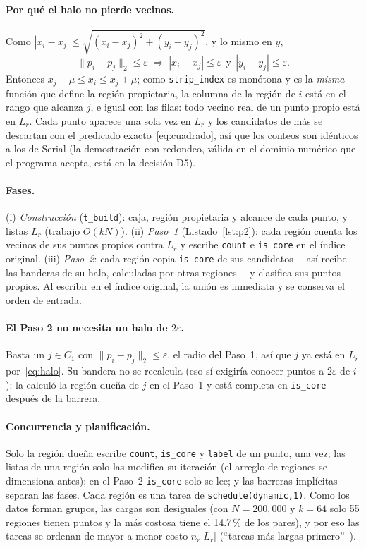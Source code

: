 \documentclass[11pt,letterpaper]{article}
\newcommand{\code}[1]{\texttt{#1}}
\begin{document}
\paragraph{Por qué el halo no pierde vecinos.} Como $|x_i-x_j|\le\sqrt{(x_i-x_j)^2+(y_i-y_j)^2}$, y lo mismo en $y$,
\begin{equation}\label{eq:halo}
  \lVert p_i-p_j\rVert_2\le\varepsilon \;\Longrightarrow\; |x_i-x_j|\le\varepsilon\ \ \text{y}\ \
  |y_i-y_j|\le\varepsilon .
\end{equation}
Entonces $x_j-\mu\le x_i\le x_j+\mu$; como \code{strip\_index} es monótona y es la \emph{misma} función que define
la región propietaria, la columna de la región de $i$ está en el rango que alcanza $j$, e igual con las filas: todo
vecino real de un punto propio está en $L_r$. Cada punto aparece una sola vez en $L_r$ y los candidatos de más se
descartan con el predicado exacto~\eqref{eq:cuadrado}, así que los conteos son idénticos a los de Serial (la
demostración con redondeo, válida en el dominio numérico que el programa acepta, está en la decisión D5).

\paragraph{Fases.} (i) \emph{Construcción} (\code{t\_build}): caja, región propietaria y alcance de cada punto, y
listas $L_r$ (trabajo $O(kN)$). (ii) \emph{Paso~1} (Listado~\ref{lst:p2}): cada región cuenta los vecinos de sus
puntos propios contra $L_r$ y escribe \code{count} e \code{is\_core} en el índice original. (iii) \emph{Paso~2}: cada
región copia \code{is\_core} de sus candidatos ---así recibe las banderas de su halo, calculadas por otras
regiones--- y clasifica sus puntos propios. Al escribir en el índice original, la unión es inmediata y se conserva el
orden de entrada.

\paragraph{El Paso 2 no necesita un halo de $2\varepsilon$.} Basta un $j\in C_1$ con
$\lVert p_i-p_j\rVert_2\le\varepsilon$, el radio del Paso~1, así que $j$ ya está en $L_r$ por~\eqref{eq:halo}. Su
bandera no se recalcula (eso sí exigiría conocer puntos a $2\varepsilon$ de $i$): la calculó la región dueña de $j$
en el Paso~1 y está completa en \code{is\_core} después de la barrera.

\paragraph{Concurrencia y planificación.} Solo la región dueña escribe \code{count}, \code{is\_core} y \code{label}
de un punto, una vez; las listas de una región solo las modifica su iteración (el arreglo de regiones se dimensiona
antes); en el Paso~2 \code{is\_core} solo se lee; y las barreras implícitas separan las fases. Cada región es una
tarea de \code{schedule(dynamic,1)}. Como los datos forman grupos, las cargas son desiguales (con $N=200{,}000$ y
$k=64$ solo 55 regiones tienen puntos y la más costosa tiene el 14.7\,\% de los pares), y por eso las tareas se
ordenan de mayor a menor costo $n_r|L_r|$ (``tareas más largas primero''~\cite{graham1969}).
\end{document}
